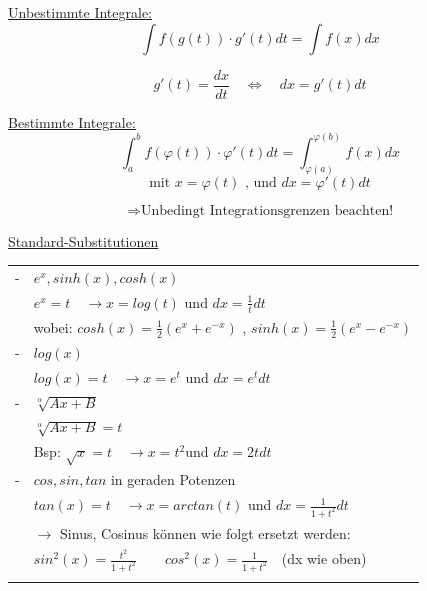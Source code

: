 \documentclass[6pt]{article}
\begin{document}
\begin{multicols*}{3}
	\underline{Unbestimmte Integrale:}
	\[
			\int f(g(t)) \cdot g'(t) dt = \int f(x) dx
	\]
	
	\[
			g'(t) = \frac{dx}{dt} \quad \Leftrightarrow  \quad dx = g'(t)dt
	\]
	
	\underline{Bestimmte Integrale:}
	\[
			\int_{a}^{b} f(\varphi(t)) \cdot \varphi'(t) dt = \int_{\varphi(a)}^{\varphi(b)} f(x) dx
	\]
	\[
			\text{mit } x=\varphi(t) \text{ , und } dx = \varphi'(t)dt
	\]
	
	\[\Rightarrow \text{Unbedingt Integrationsgrenzen beachten!}\]
		
	\columnbreak
	\underline{Standard-Substitutionen} \vspace{1mm} \\
	
		\begin{onehalfspace} 
			\begin{tabular}{ll}
			\hline \vspace{1mm}
				- 	& $e^x, sinh(x), cosh(x)$  \\
				 	& $e^x = t  \quad \rightarrow x=log(t)$ und $dx = \frac{1}{t}dt$\\
				 	& wobei:  $cosh(x) = \frac{1}{2}(e^x+e^{-x})$ , $sinh(x) = \frac{1}{2}(e^x-e^{-x})$  \vspace{1mm} \\ \hline \vspace{1mm}  
				  
				- 	& $log(x)$  \\
					& $log(x) = t \quad \rightarrow x=e^t$ und $dx = e^t dt$  \vspace{1mm} \\ \hline \vspace{1mm} 
				
				- 	& $\sqrt[\alpha]{Ax+B}$  \\
				 	& $\sqrt[\alpha]{Ax+B} = t$ \\
				 	& Bsp: $\sqrt{x} =t \quad \rightarrow x = t^2$und $dx = 2t dt$ \vspace{1mm} \\ \hline \vspace{1mm} 
				
				- 	& $cos, sin, tan$ in geraden Potenzen  \\
					& $tan(x) = t  \quad \rightarrow x=arctan(t)$ und $dx = \frac{1}{1+t^2}dt$ \\
					& $\rightarrow $ Sinus, Cosinus k{\"o}nnen wie folgt ersetzt werden: \vspace{1mm} \\
					& $sin^2(x)=\frac{t^2}{1+t^2} \qquad cos^2(x) =\frac{1}{1+t^2} \quad$(dx wie oben) 	 \vspace{1mm} \\ \hline \vspace{1mm} 
				

\end{tabular}
\end{onehalfspace}
\end{multicols*}
\end{document}
